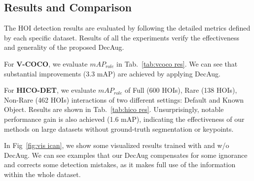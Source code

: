 \documentclass[10pt,twocolumn,letterpaper]{article}
\begin{document}
\begin{figure*}[tb!]
\centering


\vfill

\caption{HOI detection results of iCAN trained with (top) and w/o (bottom) DecAug. DecAug brings more accurate detection.}
\label{fig:vis ican}
\end{figure*}

\subsection{Results and Comparison}
\label{sec:exp}


The HOI detection results are evaluated by following the detailed metrics defined by each specific dataset. Results of all the experiments verify the effectiveness and generality of the proposed DecAug.

For \textbf{V-COCO}, we evaluate $mAP_{role}$ in Tab.~\ref{tab:vcoco res}. We can see that substantial improvements (3.3 mAP) are achieved by applying DecAug.

For \textbf{HICO-DET}, we evaluate $mAP_{role}$ of Full (600 HOIs), Rare (138 HOIs), Non-Rare (462 HOIs) interactions of two different settings: Default and Known Object. Results are shown in Tab.~\ref{tab:hico res}. Unsurprisingly, notable performance gain is also achieved (1.6 mAP), indicating the effectiveness of our methods on large datasets without ground-truth segmentation or keypoints.

In Fig~\ref{fig:vis ican}, we show some visualized results trained with and w/o DecAug. We can see examples that our DecAug compensates for some ignorance and corrects some detection mistakes, as it makes full use of the information within the whole dataset.
\end{document}
